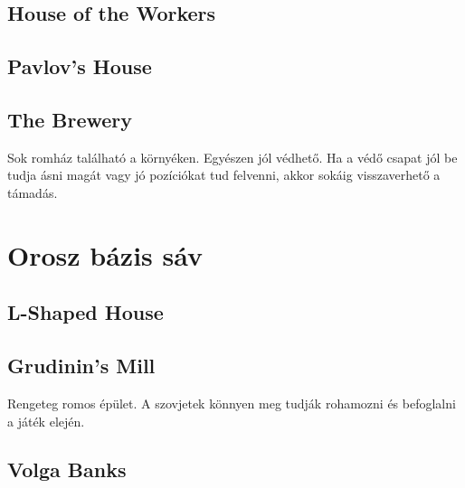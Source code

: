 \subsection{House of the Workers}

\subsection{Pavlov's House}

\subsection{The Brewery}
Sok romház található a környéken. Egyészen jól védhető. Ha a védő csapat jól be tudja ásni magát vagy jó pozíciókat tud felvenni, akkor sokáig visszaverhető a támadás.

\section{Orosz bázis sáv}
\subsection{L-Shaped House}

\subsection{Grudinin's Mill}
Rengeteg romos épület. A szovjetek könnyen meg tudják rohamozni és befoglalni a játék elején.

\subsection{Volga Banks}
